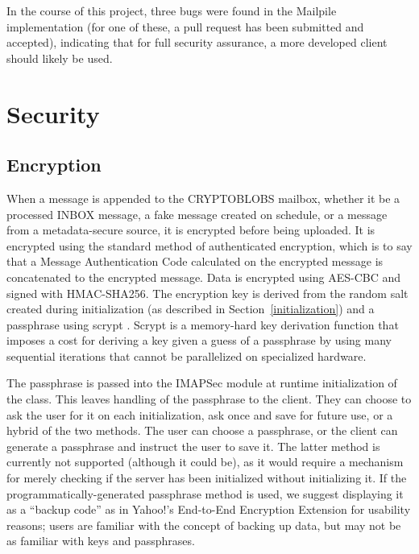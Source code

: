 \documentclass[pageno]{jpaper}
\newcommand{\project}{IMAPSec }
\begin{document}
In the course of this project, three bugs were found in the Mailpile implementation (for one of these, a pull request has been submitted and accepted), indicating that for full security assurance, a more developed client should likely be used.




\section{Security}

\subsection{Encryption}
\label{encryption}

When a message is appended to the CRYPTOBLOBS mailbox, whether it be a processed INBOX message, a fake message created on schedule, or a message from a metadata-secure source, it is encrypted before being uploaded. It is encrypted using the standard method of authenticated encryption, which is to say that a Message Authentication Code calculated on the encrypted message is concatenated to the encrypted message. Data is encrypted using AES-CBC and signed with HMAC-SHA256. The encryption key is derived from the random salt created during initialization (as described in Section~\ref{initialization}) and a passphrase using scrypt \cite{percival2009stronger}. Scrypt is a memory-hard key derivation function that imposes a cost for deriving a key given a guess of a passphrase by using many sequential iterations that cannot be parallelized on specialized hardware.

The passphrase is passed into the \project module at runtime initialization of the class. This leaves handling of the passphrase to the client. They can choose to ask the user for it on each initialization, ask once and save for future use, or a hybrid of the two methods. The user can choose a passphrase, or the client can generate a passphrase and instruct the user to save it. The latter method is currently not supported (although it could be), as it would require a mechanism for merely checking if the server has been initialized without initializing it. If the programmatically-generated passphrase method is used, we suggest displaying it as a ``backup code'' as in Yahoo!'s End-to-End Encryption Extension \cite{yahoo} for usability reasons; users are familiar with the concept of backing up data, but may not be as familiar with keys and passphrases.
\end{document}

